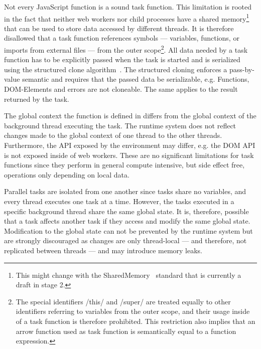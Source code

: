 Not every JavaScript function is a sound task function. This limitation is rooted in the fact that neither web workers nor child processes have a shared memory\footnote{This might change with the SharedMemory~\cite{Ecma2016} standard that is currently a draft in stage 2.} that can be used to store data accessed by different threads. It is therefore disallowed that a task function references symbols --- variables, functions, or imports from external files --- from the outer scope\footnote{The special identifiers \javascriptinline/this/ and \javascriptinline/super/ are treated equally to other identifiers referring to variables from the outer scope, and their usage inside of a task function is therefore prohibited. This restriction also implies that an arrow function used as task function is semantically equal to a function expression.}. All data needed by a task function has to be explicitly passed when the task is started and is serialized using the structured clone algorithm~\cite[Section 2.9.4]{WHATWG2016}. The structured cloning enforces a pass-by-value semantic and requires that the passed data be serializable, e.g. Functions, DOM-Elements and errors are not cloneable. The same applies to the result returned by the task. 

The global context the function is defined in differs from the global context of the background thread executing the task. The runtime system does not reflect changes made to the global context of one thread to the other threads. Furthermore, the API exposed by the environment may differ, e.g. the DOM API is not exposed inside of web workers. These are no significant limitations for task functions since they perform in general compute intensive, but side effect free, operations only depending on local data.

Parallel tasks are isolated from one another since tasks share no variables, and every thread executes one task at a time. However, the tasks executed in a specific background thread share the same global state. It is, therefore, possible that a task affects another task if they access and modify the same global state. Modification to the global state can not be prevented by the runtime system but are strongly discouraged as changes are only thread-local --- and therefore, not replicated between threads --- and may introduce memory leaks. 

